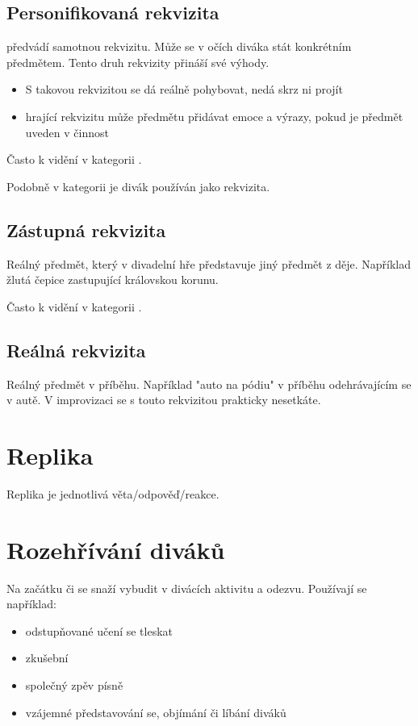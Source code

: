 \documentclass[main.tex]{subfiles}
\begin{document}
\subsection{ Personifikovaná rekvizita }  předvádí samotnou rekvizitu. Může se v očích diváka stát konkrétním předmětem. Tento druh rekvizity přináší své výhody.  
 
\begin{itemize}
\item  S takovou rekvizitou se dá reálně pohybovat, nedá skrz ni projít
\item  {} hrající rekvizitu může předmětu přidávat emoce a výrazy, pokud je předmět uveden v činnost
\end{itemize}
 
Často k vidění v kategorii . 
 
Podobně v kategorii  je divák používán jako rekvizita. 
 
\subsection{ Zástupná rekvizita } Reálný předmět, který v divadelní hře představuje jiný předmět z děje. Například žlutá čepice zastupující královskou korunu. 
 
Často k vidění v kategorii . 
 
\subsection{ Reálná rekvizita } Reálný předmět v příběhu. Například "auto na pódiu"{} v příběhu odehrávajícím se v autě. V improvizaci se s touto rekvizitou prakticky nesetkáte. 
 
  
 
 
\needspace{5cm} \section{Replika} \label{replika} Replika je jednotlivá věta/odpověď/reakce. 
 
\needspace{5cm} \section{Rozehřívání diváků} \label{rozehřívání diváků} Na začátku  či  se   snaží vybudit v divácích aktivitu a odezvu. 
Používají se například: 
\begin{itemize}
\item odstupňované učení se tleskat
\item zkušební 
\item společný zpěv písně
\item vzájemné představování se, objímání či líbání diváků
\end{itemize}
 
\end{document}
